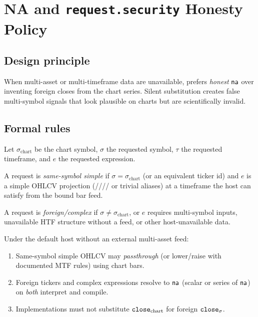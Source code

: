 \documentclass[11pt,a4paper]{article}
\begin{document}
\section{NA and \texttt{request.security} Honesty Policy}
\label{sec:na}

\subsection{Design principle}
When multi-asset or multi-timeframe data are unavailable, \pyne{} prefers
\emph{honest} $\textsf{na}$ over inventing foreign closes from the chart series.
Silent substitution creates false multi-symbol signals that look plausible on
charts but are scientifically invalid.

\subsection{Formal rules}
Let $\sigma_{\mathrm{chart}}$ be the chart symbol, $\sigma$ the requested
symbol, $\tau$ the requested timeframe, and $e$ the requested expression.

\begin{definition}
\label{def:same-sym}
A request is \emph{same-symbol simple} if $\sigma=\sigma_{\mathrm{chart}}$
(or an equivalent ticker id) and $e$ is a simple OHLCV projection
(//// or trivial
aliases) at a timeframe the host can satisfy from the bound bar feed.
\end{definition}

\begin{definition}
\label{def:foreign}
A request is \emph{foreign/complex} if $\sigma\neq\sigma_{\mathrm{chart}}$,
or $e$ requires multi-symbol inputs, unavailable HTF structure without a
feed, or other host-unavailable data.
\end{definition}

\begin{proposition}
\label{prop:honest}
Under the default host without an external multi-asset feed:
\begin{enumerate}[leftmargin=*]
  \item Same-symbol simple OHLCV may \emph{passthrough} (or lower/raise with
    documented MTF rules) using chart bars.
  \item Foreign tickers and complex  expressions resolve
    to $\textsf{na}$ (scalar or series of $\textsf{na}$) on \emph{both} interpret and compile.
  \item Implementations must not substitute $\texttt{close}_{\mathrm{chart}}$
    for foreign $\texttt{close}_{\sigma}$.
\end{enumerate}
\end{proposition}
\end{document}
